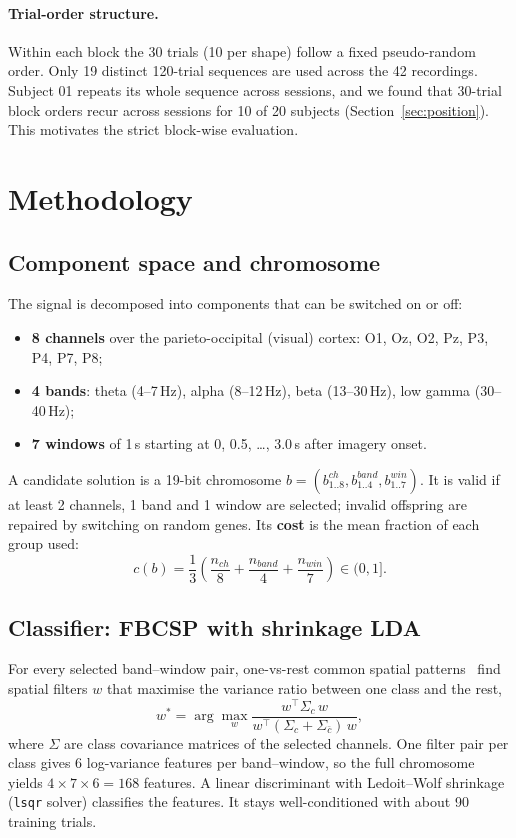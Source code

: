\documentclass[11pt,a4paper]{article}
\begin{document}
\paragraph{Trial-order structure.} Within each block the 30 trials (10 per shape) follow a fixed
pseudo-random order. Only 19 distinct 120-trial sequences are used across the 42 recordings. Subject 01
repeats its whole sequence across sessions, and we found that 30-trial block orders recur across
sessions for 10 of 20 subjects (Section~\ref{sec:position}). This motivates the strict block-wise
evaluation.

\section{Methodology}

\subsection{Component space and chromosome}
The signal is decomposed into components that can be switched on or off:
\begin{itemize}
  \item \textbf{8 channels} over the parieto-occipital (visual) cortex: O1, Oz, O2, Pz, P3, P4, P7, P8;
  \item \textbf{4 bands}: theta (4--7\,Hz), alpha (8--12\,Hz), beta (13--30\,Hz), low gamma (30--40\,Hz);
  \item \textbf{7 windows} of 1\,s starting at 0, 0.5, \dots, 3.0\,s after imagery onset.
\end{itemize}
A candidate solution is a 19-bit chromosome $b=(b^{ch}_{1..8},b^{band}_{1..4},b^{win}_{1..7})$. It is
valid if at least 2 channels, 1 band and 1 window are selected; invalid offspring are repaired by
switching on random genes. Its \textbf{cost} is the mean fraction of each group used:
\begin{equation}
  c(b)=\frac{1}{3}\left(\frac{n_{ch}}{8}+\frac{n_{band}}{4}+\frac{n_{win}}{7}\right)\in(0,1].
\end{equation}

\subsection{Classifier: FBCSP with shrinkage LDA}
For every selected band--window pair, one-vs-rest common spatial patterns~\cite{ang2008} find spatial
filters $w$ that maximise the variance ratio between one class and the rest,
\begin{equation}
  w^\ast=\arg\max_w \frac{w^\top\Sigma_{c}\,w}{w^\top(\Sigma_{c}+\Sigma_{\bar c})\,w},
\end{equation}
where $\Sigma$ are class covariance matrices of the selected channels. One filter pair per class gives
6 log-variance features per band--window, so the full chromosome yields $4\times7\times6=168$ features.
A linear discriminant with Ledoit--Wolf shrinkage~\cite{ledoit2004} (\texttt{lsqr} solver) classifies
the features. It stays well-conditioned with about 90 training trials.
\end{document}
